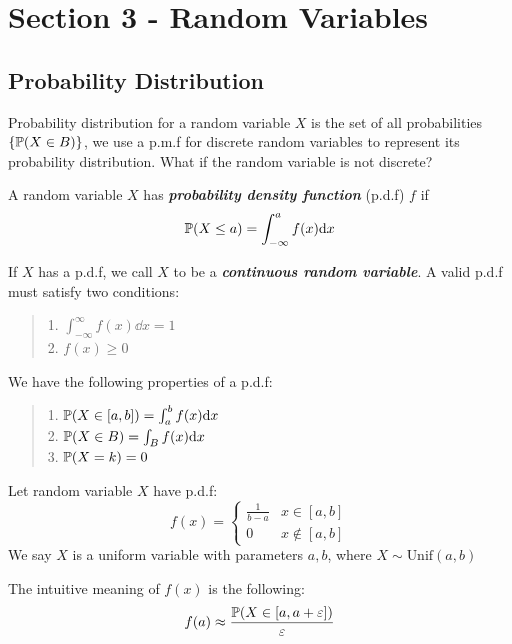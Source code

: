\section{Section 3 - Random Variables}
\subsection{Probability Distribution}
Probability distribution for a random variable $X$ is the set of all probabilities $\{\mathbb{P}(X \in B)\}$, we use a p.m.f for discrete random variables to represent its probability distribution. What if the random variable is not discrete?
\begin{definition}
    A random variable $X$ has \textbf{\textit{probability density function}} (p.d.f) $f$ if
    $$\mathbb{P}(X \le a) = \int_{-\infty}^{a} f(x) \dd x$$
\end{definition}
If $X$ has a p.d.f, we call $X$ to be a \textbf{\textit{continuous random variable}}. A valid p.d.f must satisfy two conditions:
\begin{quote}
    1. $\displaystyle \int_{-\infty}^{\infty} f(x) \dd x = 1$ \\
    2. $f(x) \ge 0$
\end{quote}
We have the following properties of a p.d.f:
\begin{quote}
    1. $\mathbb{P}(X \in [a, b]) = \int_{a}^{b} f(x) \dd x$ \\
    2. $\mathbb{P}(X \in B) = \int_{B} f(x) \dd x$ \\
    3. $\mathbb{P}(X = k) = 0$
\end{quote}
\begin{definition}
    Let random variable $X$ have p.d.f:
    $$f(x) = \begin{cases}
        \frac{1}{b - a} & x \in [a, b] \\
        0 & x \notin [a, b]
    \end{cases}$$
    We say $X$ is a uniform variable with parameters $a, b$, where $X \sim \text{Unif}(a, b)$
\end{definition}
The intuitive meaning of $f(x)$ is the following:
$$f(a) \approx \frac{\mathbb{P}(X \in [a, a+\varepsilon])}{\varepsilon}$$

